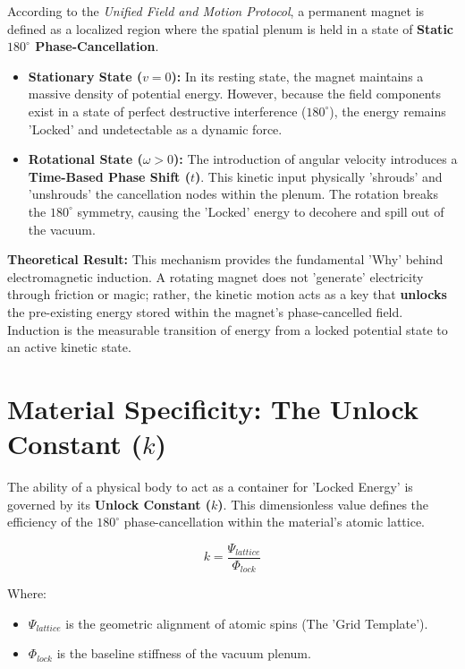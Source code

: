 \documentclass[11pt]{article}
\begin{document}
According to the \textit{Unified Field and Motion Protocol}, a permanent magnet is defined as a localized region where the spatial plenum is held in a state of \textbf{Static $180^\circ$ Phase-Cancellation}.

\begin{itemize}
    \item \textbf{Stationary State ($v = 0$):} In its resting state, the magnet maintains a massive density of potential energy. However, because the field components exist in a state of perfect destructive interference ($180^\circ$), the energy remains 'Locked' and undetectable as a dynamic force.
    
    \item \textbf{Rotational State ($\omega > 0$):} The introduction of angular velocity introduces a \textbf{Time-Based Phase Shift ($t$)}. This kinetic input physically 'shrouds' and 'unshrouds' the cancellation nodes within the plenum. The rotation breaks the $180^\circ$ symmetry, causing the 'Locked' energy to decohere and spill out of the vacuum.
\end{itemize}



\textbf{Theoretical Result:} This mechanism provides the fundamental 'Why' behind electromagnetic induction. A rotating magnet does not 'generate' electricity through friction or magic; rather, the kinetic motion acts as a key that \textbf{unlocks} the pre-existing energy stored within the magnet’s phase-cancelled field. Induction is the measurable transition of energy from a locked potential state to an active kinetic state.

\section*{Material Specificity: The Unlock Constant ($k$)}
The ability of a physical body to act as a container for 'Locked Energy' is governed by its \textbf{Unlock Constant ($k$)}. This dimensionless value defines the efficiency of the $180^\circ$ phase-cancellation within the material's atomic lattice.

\begin{equation}
    k = \frac{\Psi_{lattice}}{\Phi_{lock}}
\end{equation}

Where:
\begin{itemize}
    \item $\Psi_{lattice}$ is the geometric alignment of atomic spins (The 'Grid Template').
    \item $\Phi_{lock}$ is the baseline stiffness of the vacuum plenum.
\end{itemize}
\end{document}
